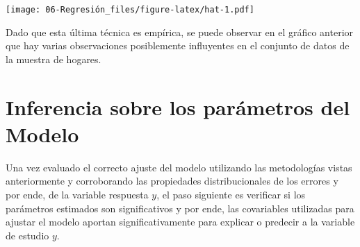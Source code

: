 \documentclass[
  12pt,
]{book}
\newenvironment{Shaded}{\begin{snugshade}}{\end{snugshade}}
\newcommand{\AttributeTok}[1]{\textcolor[rgb]{0.77,0.63,0.00}{#1}}
\newcommand{\ConstantTok}[1]{\textcolor[rgb]{0.00,0.00,0.00}{#1}}
\newcommand{\DecValTok}[1]{\textcolor[rgb]{0.00,0.00,0.81}{#1}}
\newcommand{\FunctionTok}[1]{\textcolor[rgb]{0.00,0.00,0.00}{#1}}
\newcommand{\NormalTok}[1]{#1}
\newcommand{\OtherTok}[1]{\textcolor[rgb]{0.56,0.35,0.01}{#1}}
\newcommand{\SpecialCharTok}[1]{\textcolor[rgb]{0.00,0.00,0.00}{#1}}
\newcommand{\StringTok}[1]{\textcolor[rgb]{0.31,0.60,0.02}{#1}}
\begin{document}
\begin{Shaded}
\end{Shaded}

\texttt{[image: 06-Regresión\_files/figure-latex/hat-1.pdf]}

Dado que esta última técnica es empírica, se puede observar en el gráfico anterior que hay varias observaciones posiblemente influyentes en el conjunto de datos de la muestra de hogares.

\hypertarget{inferencia-sobre-los-paruxe1metros-del-modelo}{%
\section{Inferencia sobre los parámetros del Modelo}\label{inferencia-sobre-los-paruxe1metros-del-modelo}}

Una vez evaluado el correcto ajuste del modelo utilizando las metodologías vistas anteriormente y corroborando las propiedades distribucionales de los errores y por ende, de la variable respuesta \(y\), el paso siguiente es verificar si los parámetros estimados son significativos y por ende, las covariables utilizadas para ajustar el modelo aportan significativamente para explicar o predecir a la variable de estudio \(y\).
\end{document}
